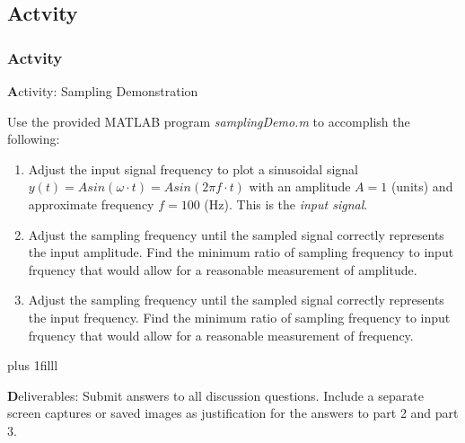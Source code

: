 \documentclass[fleqn]{beamer} %
\newcommand{\sectionIIIsubsectionVtitle}{Actvity}
\newcommand{\btVFill}{\vskip0pt plus 1filll}
\begin{document}
		\subsection{\sectionIIIsubsectionVtitle}\label{sectionIIIsubsectionV}	
\begin{frame} \scriptsize
\frametitle{\sectionIIIsubsectionVtitle}
\bigskip

{\textbf Activity: Sampling Demonstration}

Use the provided MATLAB program {\it samplingDemo.m} to accomplish the following: \vspace{5mm}\\ 

\begin{enumerate} \tiny

	\item Adjust the input signal frequency to plot a sinusoidal signal $y(t)=Asin(\omega\cdot t)=Asin(2\pi f \cdot t)$ with an amplitude $A=1$ (units) and approximate frequency $f=100$ (Hz). This is the {\it input signal}. \vspace{8mm}\\ 
	
	\item Adjust the sampling frequency until the sampled signal correctly represents the input amplitude. Find the minimum ratio of sampling frequency to input frquency that would allow for a reasonable measurement of amplitude. \vspace{8mm}\\ 

	\item Adjust the sampling frequency until the sampled signal correctly represents the input frequency. Find the minimum ratio of sampling frequency to input frquency that would allow for a reasonable measurement of frequency.	

\end{enumerate}

\btVFill

\tiny
{\textbf Deliverables: Submit answers to all discussion questions. Include a separate screen captures or saved images as justification for the answers to part 2 and part 3. }



\end{frame}
	
\end{document}
